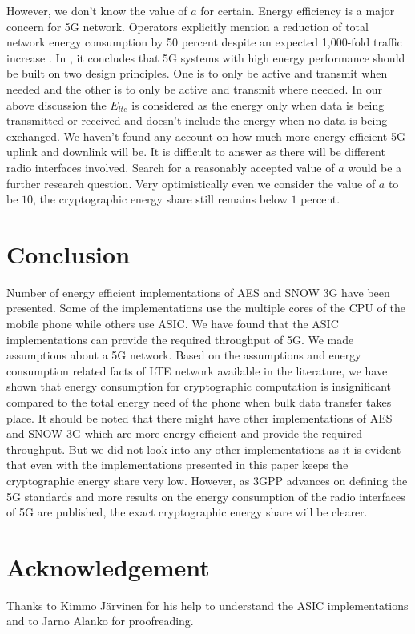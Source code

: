 \documentclass[lnicst,sechang,a4paper]{svmultln}
\begin{document}
However, we don't know the value of $a$ for certain. Energy efficiency is a major concern for 5G network. Operators explicitly mention a reduction of total network energy consumption by 50 percent despite an expected 1,000-fold traffic increase \cite{NGMN_Whie_Paper}. In \cite{Ericsson_white_paper_energy}, it concludes that 5G systems with high energy performance should be built on two design principles. One is to only be active and transmit when needed and the other is to only be active and transmit where needed. In our above discussion the $E_{lte}$ is considered as the energy only when data is being transmitted or received and doesn't include the energy when no data is being exchanged. We haven't found any account on how much more energy efficient 5G uplink and downlink will be. It is difficult to answer as there will be different radio interfaces involved. Search for a reasonably accepted value of $a$ would be a further research question. Very optimistically even we consider the value of $a$ to be $10$, the cryptographic energy share still remains below $1$ percent.

\section{Conclusion}
\label{sec:conclusion}
Number of energy efficient implementations of AES and SNOW 3G have been presented. Some of the implementations use the multiple cores of the CPU of the mobile phone while others use ASIC. We have found that the ASIC implementations can provide the required throughput of 5G. We made assumptions about a 5G network. Based on the assumptions and energy consumption related facts of LTE network available in the literature, we have shown that energy consumption for cryptographic computation is insignificant compared to the total energy need of the phone when bulk data transfer takes place. It should be noted that there might have other implementations of AES and SNOW 3G which are more energy efficient and provide the required throughput. But we did not look into any other implementations as it is evident that even with the implementations presented in this paper keeps the cryptographic energy share very low. However, as 3GPP advances on defining the 5G standards and more results on the energy consumption of the radio interfaces of 5G are published, the exact cryptographic energy share will be clearer.
\section{Acknowledgement}
\label{sec:acknowledgement}
Thanks to Kimmo J{\"a}rvinen for his help to understand the ASIC implementations and to Jarno Alanko for proofreading.
\end{document}
